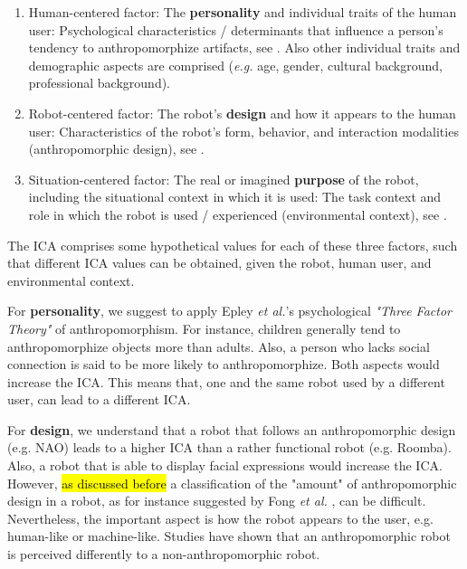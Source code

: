 \documentclass[lettersize, apacite, twoside, HRI]{apa_HRI}
\begin{document}
\begin{enumerate}

	\item Human-centered factor: The \textbf{personality} and individual traits of the human user: Psychological characteristics / determinants that influence a person's tendency to anthropomorphize artifacts, see \cite{epley_seeing_2007}. Also other individual traits and demographic aspects are comprised (\textit{e.g.} age, gender, cultural background, professional background).
	
	\item Robot-centered factor: The robot's \textbf{design} and how it appears to the human user: Characteristics of the robot's form, behavior, and interaction modalities (anthropomorphic design), see \cite{fong_survey_2003}.
	
	\item Situation-centered factor: The real or imagined \textbf{purpose} of the robot, including the situational context in which it is used: The task context and role in which the robot is used / experienced (environmental context), see \cite{joosse_what_2013}.

\end{enumerate}	

	The ICA comprises some hypothetical values for each of these three factors, such that different ICA values can be obtained, given the robot, human user, and environmental context.
	
	For \textbf{personality}, we suggest to apply Epley \textit{et al.}'s \cite{epley_seeing_2007} psychological \textit{"Three Factor Theory"} of anthropomorphism. For instance, children generally tend to anthropomorphize objects more than adults. Also, a person who lacks social connection is said to be more likely to anthropomorphize. Both aspects would increase the ICA. This means that, one and the same robot used by a different user, can lead to a different ICA.
	
	For \textbf{design}, we understand that a robot that follows an anthropomorphic design (e.g. NAO) leads to a higher ICA than a rather functional robot (e.g. Roomba). Also, a robot that is able to display facial expressions would increase the ICA. However, \hl{as discussed before} a classification of the "amount" of anthropomorphic design in a robot, as for instance suggested by Fong \textit{et al.} \cite{fong_survey_2003}, can be difficult. Nevertheless, the important aspect is how the robot appears to the user, e.g. human-like or machine-like. Studies have shown that an anthropomorphic robot is perceived differently to a non-anthropomorphic robot.
	
\end{document}

